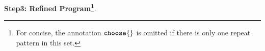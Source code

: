 %
\textbf{Step3: Refined Program\footnote{For concise, the annotation $\rpchoose{}$ is omitted if there is only one repeat pattern in this set.}}.

